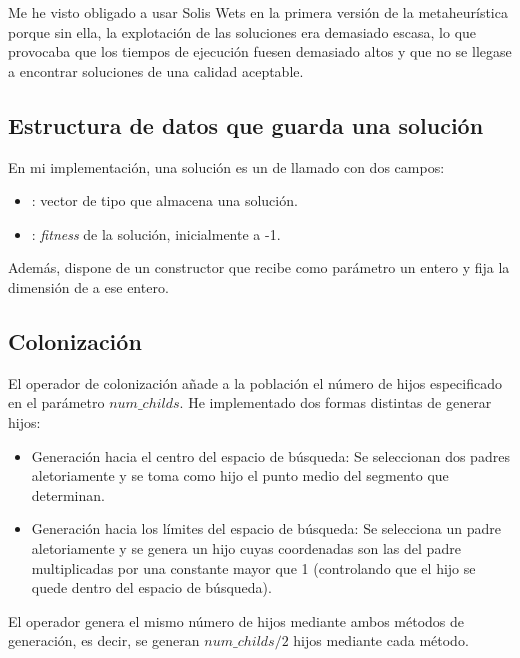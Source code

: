 \documentclass[10pt,a4paper]{article}
\begin{document}
Me he visto obligado a usar Solis Wets en la primera versión de la metaheurística porque sin ella, la explotación de las soluciones era demasiado escasa, lo que provocaba que los tiempos de ejecución fuesen demasiado altos y que no se llegase a encontrar soluciones de una calidad aceptable.


\subsection{Estructura de datos que guarda una solución}

En mi implementación, una solución es un  de  llamado  con dos campos:

\begin{itemize}
	\item {}: vector de tipo  que almacena una solución.
	\item {}: \textit{fitness} de la solución, inicialmente a -1.
\end{itemize}

Además,  dispone de un constructor que recibe como parámetro un entero y fija la dimensión de  a ese entero.





\subsection{Colonización}

El operador de colonización añade a la población el número de hijos especificado en el parámetro $num\_childs$. He implementado dos formas distintas de generar hijos:

\begin{itemize}
	\item Generación hacia el centro del espacio de búsqueda: Se seleccionan dos padres aletoriamente y se toma como hijo el punto medio del segmento que determinan.
	\item Generación hacia los límites del espacio de búsqueda: Se selecciona un padre aletoriamente y se genera un hijo cuyas coordenadas son las del padre multiplicadas por una constante mayor que 1 (controlando que el hijo se quede dentro del espacio de búsqueda).
\end{itemize}

El operador genera el mismo número de hijos mediante ambos métodos de generación, es decir, se generan $num\_childs/2$ hijos mediante cada método.\\
\end{document}
